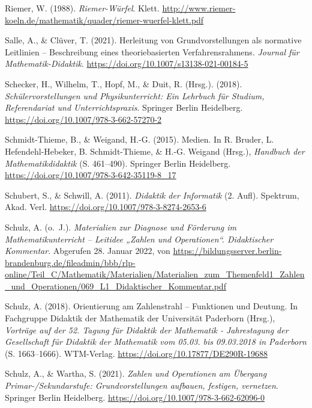 \documentclass[
]{scrbook}
\newlength{\cslhangindent}
\newlength{\cslentryspacingunit} %
\newenvironment{CSLReferences}[2] %
 {%
  \setlength{\parindent}{0pt}
  \ifodd #1
  \let\oldpar\par
  \def\par{\hangindent=\cslhangindent\oldpar}
  \fi
  \setlength{\parskip}{#2\cslentryspacingunit}
 }%
 {}
\theoremstyle{definition}
\theoremstyle{definition}
\theoremstyle{definition}
\theoremstyle{definition}
\theoremstyle{remark}
\begin{document}
\begin{CSLReferences}{1}{0}
\leavevmode{}%
Riemer, W. (1988). \emph{Riemer-{Würfel}}. Klett. \url{http://www.riemer-koeln.de/mathematik/quader/riemer-wuerfel-klett.pdf}

\leavevmode{}%
Salle, A., \& Clüver, T. (2021). Herleitung von {Grundvorstellungen} als normative {Leitlinien} -- {Beschreibung} eines theoriebasierten {Verfahrensrahmens}. \emph{Journal für Mathematik-Didaktik}. \url{https://doi.org/10.1007/s13138-021-00184-5}

\leavevmode{}%
Schecker, H., Wilhelm, T., Hopf, M., \& Duit, R. (Hrsg.). (2018). \emph{Schülervorstellungen und {Physikunterricht}: {Ein} {Lehrbuch} für {Studium}, {Referendariat} und {Unterrichtspraxis}}. Springer Berlin Heidelberg. \url{https://doi.org/10.1007/978-3-662-57270-2}

\leavevmode{}%
Schmidt-Thieme, B., \& Weigand, H.-G. (2015). Medien. In R. Bruder, L. Hefendehl-Hebeker, B. Schmidt-Thieme, \& H.-G. Weigand (Hrsg.), \emph{Handbuch der {Mathematikdidaktik}} (S. 461--490). Springer Berlin Heidelberg. \url{https://doi.org/10.1007/978-3-642-35119-8_17}

\leavevmode{}%
Schubert, S., \& Schwill, A. (2011). \emph{Didaktik der {Informatik}} (2. Aufl). Spektrum, Akad. Verl. \url{https://doi.org/10.1007/978-3-8274-2653-6}

\leavevmode{}%
Schulz, A. (o.~J.). \emph{Materialien zur {Diagnose} und {Förderung} im {Mathematikunterricht} -- {Leitidee} „{Zahlen} und {Operationen}``. {Didaktischer} {Kommentar}}. Abgerufen 28. Januar 2022, von \url{https://bildungsserver.berlin-brandenburg.de/fileadmin/bbb/rlp-online/Teil_C/Mathematik/Materialien/Materialien_zum_Themenfeld1_Zahlen_und_Operationen/069_L1_Didaktischer_Kommentar.pdf}

\leavevmode{}%
Schulz, A. (2018). Orientierung am {Zahlenstrahl} -- {Funktionen} und {Deutung}. In Fachgruppe Didaktik der Mathematik der Universität Paderborn (Hrsg.), \emph{Vorträge auf der 52. Tagung für Didaktik der Mathematik - Jahrestagung der Gesellschaft für Didaktik der Mathematik vom 05.03. bis 09.03.2018 in Paderborn} (S. 1663--1666). WTM-Verlag. \url{https://doi.org/10.17877/DE290R-19688}

\leavevmode{}%
Schulz, A., \& Wartha, S. (2021). \emph{Zahlen und {Operationen} am Übergang {Primar}-/{Sekundarstufe}: {Grundvorstellungen} aufbauen, festigen, vernetzen}. Springer Berlin Heidelberg. \url{https://doi.org/10.1007/978-3-662-62096-0}


\end{CSLReferences}
\end{document}
